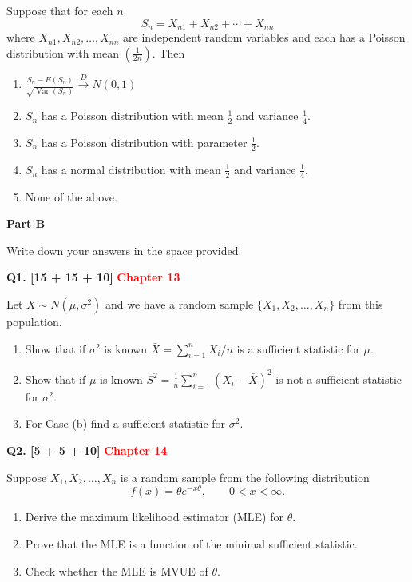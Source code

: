 \documentclass[11pt]{article}
\begin{document}
Suppose that for each $n$
\[
S_n=X_{n1}+X_{n2}+\cdots+X_{nn}
\]
where $X_{n1},X_{n2},\ldots,X_{nn}$ are independent random variables and each has a Poisson distribution with mean $\left(\frac{1}{2n}\right)$. Then
\begin{enumerate}
\setlength{\itemsep}{0pt}\setlength{\parsep}{0pt}\setlength{\topsep}{2pt}
\item[(a)] $\displaystyle\frac{S_n-E(S_n)}{\sqrt{\operatorname{Var}(S_n)}}\xrightarrow{D}N(0,1)$
\item[(b)] $S_n$ has a Poisson distribution with mean $\frac{1}{2}$ and variance $\frac{1}{4}$.
\item[(c)] $S_n$ has a Poisson distribution with parameter $\frac{1}{2}$.
\item[(d)] $S_n$ has a normal distribution with mean $\frac{1}{2}$ and variance $\frac{1}{4}$.
\item[(e)] None of the above.
\end{enumerate}
\endgroup

\clearpage
\begin{center}
\textbf{Part B}
\end{center}

Write down your answers in the space provided.

\medskip
\textbf{Q1. [15 + 15 + 10]}  \textbf{\textcolor{red}{Chapter 13}}

Let $X\sim N(\mu,\sigma^2)$ and we have a random sample $\{X_1,X_2,\ldots,X_n\}$ from this population.
\begin{enumerate}
\setlength{\itemsep}{6pt}\setlength{\parsep}{0pt}\setlength{\topsep}{3pt}
\item[(a)] Show that if $\sigma^2$ is known $\bar X=\sum_{i=1}^n X_i/n$ is a sufficient statistic for $\mu$.
\item[(b)] Show that if $\mu$ is known $S^2=\frac{1}{n}\sum_{i=1}^n(X_i-\bar X)^2$ is not a sufficient statistic for $\sigma^2$.
\item[(c)] For Case (b) find a sufficient statistic for $\sigma^2$.
\end{enumerate}

\bigskip
\textbf{Q2. [5 + 5 + 10]}  \textbf{\textcolor{red}{Chapter 14}}

Suppose $X_1,X_2,\ldots,X_n$ is a random sample from the following distribution
\[
f(x)=\theta e^{-x\theta},\qquad 0<x<\infty.
\]
\begin{enumerate}
\setlength{\itemsep}{6pt}\setlength{\parsep}{0pt}\setlength{\topsep}{3pt}
\item[(a)] Derive the maximum likelihood estimator (MLE) for $\theta$.
\item[(b)] Prove that the MLE is a function of the minimal sufficient statistic.
\item[(c)] Check whether the MLE is MVUE of $\theta$.
\end{enumerate}
\end{document}

